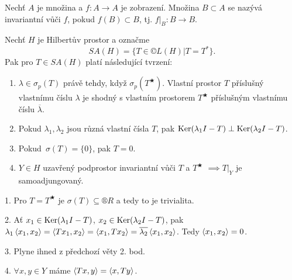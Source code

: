 \documentclass[12pt]{article}					%
\begin{document}
\begin{definice}
	Nechť $A$ je množina a $f: A \rightarrow A$ je zobrazení. Množina $B \subset A$ se nazývá invariantní vůči $f$, pokud $f(B) \subset B$, tj. $f|_B: B \rightarrow B$.
\end{definice}

\begin{lemma}
	Nechť $H$ je Hilbertův prostor a označme
	$$ SA(H) = \{T \in ©L(H)|T = T^*\}. $$
	Pak pro $T \in SA(H)$ platí následující tvrzení:

	\begin{enumerate}
		\item $\lambda \in \sigma_p(T)$ právě tehdy, když $\sigma_p(T^\bigstar)$. Vlastní prostor $T$ příslušný vlastnímu číslu $\lambda$ je shodný s vlastním prostorem $T^\bigstar$ příslušným vlastnímu číslu $\overline{\lambda}$.
		\item Pokud $\lambda_1, \lambda_2$ jsou různá vlastní čísla $T$, pak $\operatorname{Ker}(\lambda_1 I - T) \perp \operatorname{Ker}(\lambda_2 I - T)$.
		\item Pokud $\sigma(T) = \{0\}$, pak $T = 0$.
		\item $Y \in H$ uzavřený podprostor invariantní vůči $T$ a $T^\bigstar$ $\implies T|_Y$ je samoadjungovaný.
	\end{enumerate}

	\begin{dukazin}
		1. Pro $T = T^\bigstar$ je $\sigma(T) \subseteq ®R$ a tedy to je trivialita.

		2. Ať $x_1 \in \operatorname{Ker} (\lambda_1 I - T)$, $x_2 \in \operatorname{Ker}(\lambda_2 I - T)$, pak $\lambda_1\left\langle x_1, x_2\right\rangle = \left\langle Tx_1, x_2\right\rangle = \left\langle x_1, Tx_2\right\rangle = \overline{\lambda_2}\left\langle x_1, x_2\right\rangle$. Tedy $\left\langle x_1, x_2\right\rangle = 0$.

		3. Plyne ihned z předchozí věty 2. bod.

		4. $\forall x, y \in Y$ máme $\left\langle Tx, y\right\rangle = \left\langle x, Ty\right\rangle$.
	\end{dukazin}
\end{lemma}
\end{document}
